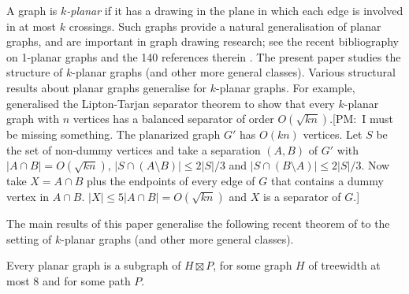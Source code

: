 \documentclass{patmorin}
\newcommand{\note}[2]{{\color{red}[#1:~#2]}}
\renewcommand{\le}{\leqslant}
\begin{document}
A graph is \emph{$k$-planar} if it has a drawing in the plane in which each edge is involved in at most $k$ crossings. Such graphs provide a natural generalisation of planar graphs, and are important in graph drawing research; see the recent bibliography on 1-planar graphs and the 140 references therein \citep{kobourov.liotta.ea:annotated}. The present paper studies the structure of $k$-planar graphs (and other more general classes). Various structural results about planar graphs generalise for $k$-planar graphs. For example, \citet{FP08} generalised the Lipton-Tarjan separator theorem to show that every $k$-planar graph with $n$ vertices has a balanced separator of order $O(\sqrt{kn})$.\note{PM}{I must be missing something.  The planarized graph $G'$ has $O(kn)$ vertices.  Let $S$ be the set of non-dummy vertices and take a separation $(A,B)$ of $G'$ with $|A\cap B|=O(\sqrt{kn})$, $|S\cap (A\setminus B)|\le 2|S|/3$ and $|S\cap (B\setminus A)|\le 2|S|/3$.  Now take $X=A\cap B$ plus the endpoints of every edge of $G$ that contains a dummy vertex in $A\cap B$.  $|X|\le 5|A\cap B|=O(\sqrt{kn})$ and $X$ is a separator of $G$.}

The main results of this paper generalise the following recent theorem of \citet{dujmovic.joret.ea:planar} to the setting of $k$-planar graphs (and other more general classes). 

\begin{thm} 
\label{PlanarBasic}
Every planar graph is a subgraph of $H\boxtimes P$, for some graph $H$ of treewidth at most $8$ and for some path $P$. 
\end{thm}
\end{document}

